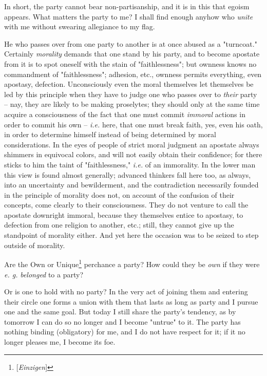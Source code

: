 \documentclass[a4paper]{book}
\begin{document}
In short, the party cannot bear non-partisanship, and it is in this that 
egoism appears. What matters the party to me? I shall find enough anyhow who 
\textit{unite} with me without swearing allegiance to my flag.

He who passes over from one party to another is at once abused as a 
"{}turncoat."{} Certainly \textit{morality} demands that one stand by his 
party, and to become apostate from it is to spot oneself with the stain of 
"{}faithlessness"{}; but ownness knows no commandment of "{}faithlessness"{}; 
adhesion, etc., ownness permits everything, even apostasy, defection. 
Unconsciously even the moral themselves let themselves be led by this 
principle when they have to judge one who passes over to \textit{their} party 
-- nay, they are likely to be making proselytes; they should only at the same 
time acquire a consciousness of the fact that one must commit \textit{immoral} 
actions in order to commit his own -- \textit{i.e.} here, that one must break 
faith, yes, even his oath, in order to determine himself instead of being 
determined by moral considerations. In the eyes of people of strict moral 
judgment an apostate always shimmers in equivocal colors, and will not easily 
obtain their confidence; for there sticks to him the taint of 
"{}faithlessness,"{} \textit{i.e.} of an immorality. In the lower man this 
view is found almost generally; advanced thinkers fall here too, as always, 
into an uncertainty and bewilderment, and the contradiction necessarily 
founded in the principle of morality does not, on account of the confusion of 
their concepts, come clearly to their consciousness. They do not venture to 
call the apostate downright immoral, because they themselves entice to 
apostasy, to defection from one religion to another, etc.; still, they cannot 
give up the standpoint of morality either. And yet here the occasion was to be 
seized to step outside of morality.

Are the Own or Unique\footnote{[\textit{Einzigen}]} perchance a party? How 
could they be \textit{own} if they were \textit{e. g.} \textit{belonged} to a 
party?

Or is one to hold with no party? In the very act of joining them and entering 
their circle one forms a union with them that lasts as long as party and I 
pursue one and the same goal. But today I still share the party's tendency, as 
by tomorrow I can do so no longer and I become "{}untrue"{} to it. The party 
has nothing binding (obligatory) for me, and I do not have respect for it; if 
it no longer pleases me, I become its foe.
\end{document}
